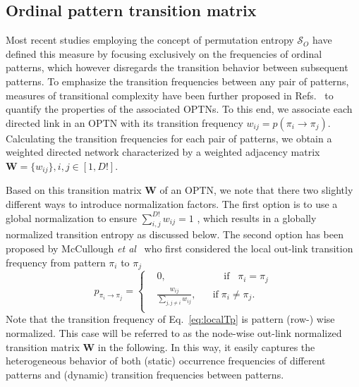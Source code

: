 \documentclass[12pt,aip,cha,reprint,nofootinbib]{revtex4-1}
\begin{document}
\subsection{Ordinal pattern transition matrix} \label{sec:OPW}

Most recent studies employing the concept of permutation entropy $\mathcal{S}_O$ have defined this measure by focusing exclusively on the frequencies of ordinal patterns, which however disregards the transition behavior between subsequent patterns. To emphasize the transition frequencies between any pair of patterns, measures of transitional complexity have been further proposed in Refs.~\cite{zhangSciRep2017,McCullough2017b} to quantify the properties of the associated OPTNs. To this end, we associate each directed link in an OPTN with its transition frequency $w_{ij} = p({\pi_i \to \pi_j})$. Calculating the transition frequencies for each pair of patterns, we obtain a weighted directed network characterized by a weighted adjacency matrix $\mathbf{W} = \{ w_{ij} \}, i, j \in [1, D!]$. 

Based on this transition matrix $\mathbf{W}$ of an OPTN, we note that there two slightly different ways to introduce normalization factors. The first option is to use a global normalization to ensure $\sum_{i,j}^{D!} w_{ij} = 1$ \cite{zhangSciRep2017}, which results in a globally normalized transition entropy as discussed below. The second option has been proposed by McCullough {\textit{et al}}~\cite{McCullough2017b} who first considered the local out-link transition frequency from pattern $\pi_i$ to $\pi_j$
\begin{equation} \label{eq:localTp}
p_{\pi_i \to \pi_j} = \left \{ \begin{aligned}
				& 0,  \;\;\;\;\;\;\;\;\;\;\;\;\;\;\;\;\;\;\;\;\; \text{if} \;\;\; \pi_i = \pi_j \\
				& \frac{w_{ij}}{\sum_{j, j \neq i} w_{ij}}, \;\;\;\;\;\; \text{if} \; \pi_i \neq \pi_j.\\
				\end{aligned}
				\right.
\end{equation}
\noindent
Note that the transition frequency of Eq.~\eqref{eq:localTp} is pattern (row-) wise normalized. This case will be referred to as the node-wise out-link normalized transition matrix $\mathbf{W}$ in the following. In this way, it easily captures the heterogeneous behavior of both (static) occurrence frequencies of different patterns and (dynamic) transition frequencies between patterns. 
\end{document}
